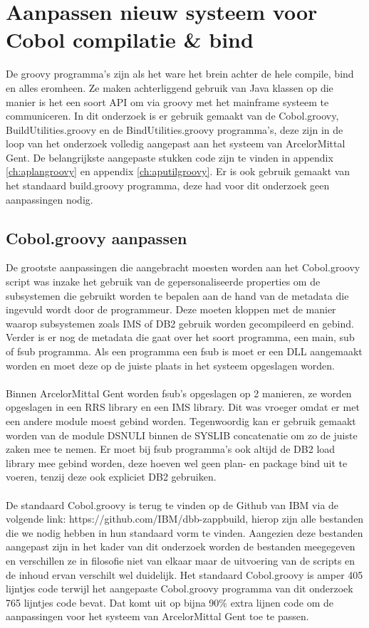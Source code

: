 \section{Aanpassen nieuw systeem voor Cobol compilatie \& bind}
De groovy programma's zijn als het ware het brein achter de hele compile, bind en alles eromheen. Ze maken achterliggend gebruik van Java klassen op die manier is het een soort API om via groovy met het mainframe systeem te communiceren. In dit onderzoek is er gebruik gemaakt van de Cobol.groovy, BuildUtilities.groovy en de BindUtilities.groovy programma's, deze zijn in de loop van het onderzoek volledig aangepast aan het systeem van ArcelorMittal Gent. De belangrijkste aangepaste stukken code zijn te vinden in appendix \ref{ch:aplangroovy} en appendix \ref{ch:aputilgroovy}. Er is ook gebruik gemaakt van het standaard build.groovy programma, deze had voor dit onderzoek geen aanpassingen nodig. 

\subsection{Cobol.groovy aanpassen}
\label{subsec:cobol.groovy aanpassen}
De grootste aanpassingen die aangebracht moesten worden aan het Cobol.groovy script was inzake het gebruik van de gepersonaliseerde properties om de subsystemen die gebruikt worden te bepalen aan de hand van de metadata die ingevuld wordt door de programmeur. Deze moeten kloppen met de manier waarop subsystemen zoals IMS of DB2 gebruik worden gecompileerd en gebind. Verder is er nog de metadata die gaat over het soort programma, een main, sub of fsub programma. Als een programma een fsub is moet er een DLL aangemaakt worden en moet deze op de juiste plaats in het systeem opgeslagen worden.
\\ \\
Binnen ArcelorMittal Gent worden fsub's opgeslagen op 2 manieren, ze worden opgeslagen in een RRS library en een IMS library. Dit was vroeger omdat er met een andere module moest gebind worden. Tegenwoordig kan er gebruik gemaakt worden van de module DSNULI binnen de SYSLIB concatenatie om zo de juiste zaken mee te nemen. Er moet bij fsub programma's ook altijd de DB2 load library mee gebind worden, deze hoeven wel geen plan- en package bind uit te voeren, tenzij deze ook expliciet DB2 gebruiken. 
\\ \\
De standaard Cobol.groovy is terug te vinden op de Github van IBM via de volgende link: https://github.com/IBM/dbb-zappbuild, hierop zijn alle bestanden die we nodig hebben in hun standaard vorm te vinden. Aangezien deze bestanden aangepast zijn in het kader van dit onderzoek worden de bestanden meegegeven en verschillen ze in filosofie niet van elkaar maar de uitvoering van de scripts en de inhoud ervan verschilt wel duidelijk. 
Het standaard Cobol.groovy is amper 405 lijntjes code terwijl het aangepaste Cobol.groovy programma van dit onderzoek 765 lijntjes code bevat. Dat komt uit op bijna 90\% extra lijnen code om de aanpassingen voor het systeem van ArcelorMittal Gent toe te passen.

